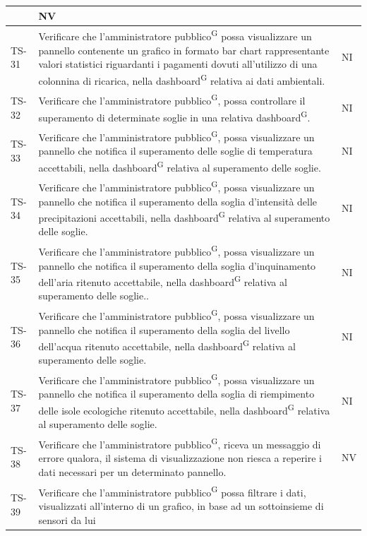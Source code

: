 \documentclass[8pt]{article}
\newcommand{\glossterm}[1]{#1\textsuperscript{G}} %
\begin{document}
\begin{longtable}{|>{\centering}p{2cm}|>{\RaggedRight}m{12cm}|>{\centering\arraybackslash}p{2cm}|}
    & NV \\
    \hline
    TS-31 & Verificare che l’\glossterm{amministratore pubblico} possa visualizzare un pannello contenente
    un grafico in formato bar chart rappresentante valori statistici riguardanti i pagamenti dovuti all'utilizzo di una colonnina di ricarica, nella \glossterm{dashboard} relativa ai dati ambientali.
    & NI \\
    \hline
    TS-32 & Verificare che l’\glossterm{amministratore pubblico}, possa controllare il superamento di determinate soglie in una relativa \glossterm{dashboard}. &
    NI \\
    \hline
    TS-33 & Verificare che l’\glossterm{amministratore pubblico}, possa visualizzare un pannello che notifica il superamento delle soglie di temperatura accettabili, nella \glossterm{dashboard} relativa al superamento delle soglie. &
    NI \\
    \hline
    TS-34 &Verificare che l’\glossterm{amministratore pubblico}, possa visualizzare un pannello che notifica il superamento della soglia d'intensità delle precipitazioni accettabili, nella \glossterm{dashboard} relativa al superamento delle soglie. &
    NI \\
    \hline
    TS-35 & Verificare che l’\glossterm{amministratore pubblico}, possa visualizzare un pannello che notifica il superamento della soglia d'inquinamento dell'aria ritenuto accettabile, nella \glossterm{dashboard} relativa al superamento delle soglie.. &
    NI \\
    \hline
    TS-36 & Verificare che l’\glossterm{amministratore pubblico}, possa visualizzare un pannello che notifica il superamento della soglia del livello dell'acqua ritenuto accettabile, nella \glossterm{dashboard} relativa al superamento delle soglie. &
    NI \\
    \hline
    TS-37 & Verificare che l’\glossterm{amministratore pubblico}, possa visualizzare un pannello che notifica il superamento della soglia di riempimento delle isole ecologiche ritenuto accettabile, nella \glossterm{dashboard} relativa al superamento delle soglie. &
    NI \\
    \hline
    TS-38 & Verificare che l’\glossterm{amministratore pubblico}, riceva un messaggio di errore qualora, il
    sistema di visualizzazione non riesca a reperire i dati necessari per un determinato pannello. &
    NV \\
    \hline
    TS-39 & Verificare che l’\glossterm{amministratore pubblico} possa filtrare i dati, visualizzati
    all’interno di un grafico, in base ad un sottoinsieme di sensori da lui

\end{longtable}
\end{document}
